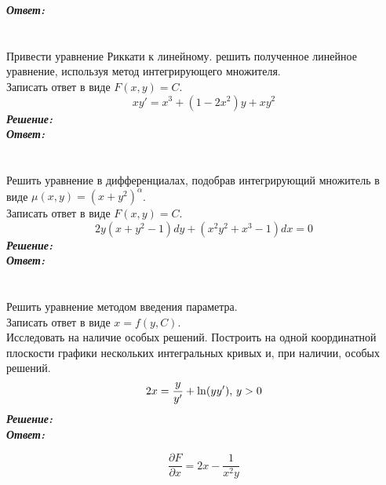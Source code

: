 \documentclass[a5paper, 10pt]{article}
\theoremstyle{definition}
\theoremstyle{plain}
\theoremstyle{remark}
\begin{document}
\textit{\textbf{Ответ:}}

\newpage
\section{}
Привести уравнение Риккати к линейному. решить полученное линейное уравнение, используя метод интегрирующего множителя.\\
Записать ответ в виде $F(x, y) = C$.
\begin{equation*}
xy' = x^3 + (1 - 2x^2)y + xy^2
\end{equation*}
\textit{\textbf{Решение:}}\\


\textit{\textbf{Ответ:}}


\newpage
\section{}
Решить уравнение в дифференциалах, подобрав интегрирующий множитель в виде $\mu (x, y) = (x+y^2)^{\alpha}$.\\
Записать ответ в виде $F(x, y) = C$.
\begin{equation*}
2y(x + y^2 - 1) dy + (x^2y^2+x^3 - 1)dx = 0
\end{equation*}
\textit{\textbf{Решение:}}\\


\textit{\textbf{Ответ:}}

\newpage
\section{}
Решить уравнение методом введения параметра. \\
Записать ответ в виде $x = f(y, C)$.\\
Исследовать на наличие особых решений. Построить на одной координатной плоскости графики нескольких интегральных кривых и, при наличии, особых решений.
\begin{equation*}
2x = \frac{y}{y'} + \ln (yy'), \, y >0\\
\end{equation*}
\textit{\textbf{Решение:}}\\


\textit{\textbf{Ответ:}}


\begin{equation*}
\frac{\partial F}{\partial x} =  2x - \frac{1}{x^2y}
\end{equation*}
\end{document}
